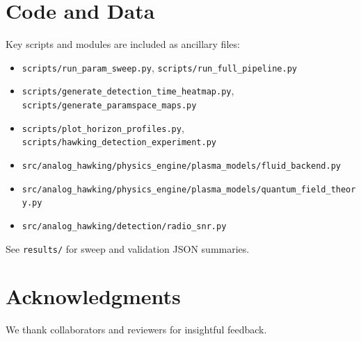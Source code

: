 \documentclass[11pt]{article}
\begin{document}
\section{Code and Data}
Key scripts and modules are included as ancillary files:
\begin{itemize}
  \item \texttt{scripts/run\_param\_sweep.py}, \texttt{scripts/run\_full\_pipeline.py}
  \item \texttt{scripts/generate\_detection\_time\_heatmap.py}, \texttt{scripts/generate\_paramspace\_maps.py}
  \item \texttt{scripts/plot\_horizon\_profiles.py}, \texttt{scripts/hawking\_detection\_experiment.py}
  \item \texttt{src/analog\_hawking/physics\_engine/plasma\_models/fluid\_backend.py}
  \item \texttt{src/analog\_hawking/physics\_engine/plasma\_models/quantum\_field\_theory.py}
  \item \texttt{src/analog\_hawking/detection/radio\_snr.py}
\end{itemize}
See \texttt{results/} for sweep and validation JSON summaries.

\section*{Acknowledgments}
We thank collaborators and reviewers for insightful feedback.
\end{document}
